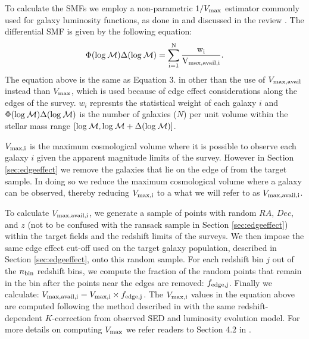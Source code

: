 \documentclass{emulateapj}
\begin{document}
To calculate the SMFs we employ a non-parametric $1/{V_{\rm{max}}}$ estimator commonly used for galaxy luminosity functions, as done in \cite{Moustakas:2013aa} and discussed 
in the review \cite{Johnston:2011aa}. 
The differential SMF is given by the following equation:
\begin{equation} \label{eq:phi}
\Phi(\rm{log}\: \mathcal{M}) \Delta(\rm{log} \:\mathcal{M}) = \sum\limits_{i=1}^{N} \frac{w_i}{V_{\rm{max,avail},i}}. 
\end{equation}
The equation above is the same as Equation 3. in \cite{Moustakas:2013aa} other than the use of $V_{\rm{max,avail}}$ instead than $V_{\rm{max}}$, which is used because of edge effect 
considerations along the edges of the survey. 
$w_i$ represnts the statistical weight of each galaxy $i$ and $\Phi(\rm{log}\: \mathcal{M}) \Delta(\rm{log}\: \mathcal{M})$ is the number of galaxies ($N$) per unit volume within the 
stellar mass range $[\rm{log} \:\mathcal{M}, \rm{log} \:\mathcal{M}+\Delta(\rm{log} \:\mathcal{M})]$.

$V_{\rm{max},i}$ is the maximum cosmological volume where it is possible to observe each galaxy $i$ given the apparent magnitude limits of the survey.
However in Section \ref{sec:edgeeffect} we remove the galaxies that lie on the edge of from the target sample. 
In doing so we reduce the maximum cosmological volume where a galaxy can be observed, thereby reducing $V_{\rm{max},i}$ to a what we will refer to as $V_{\rm{max,avail},i}$.

To calculate $V_{\rm{max,avail},i}$, we generate a sample of points with random $RA$, $Dec$, and $z$ (not to be confused with the ransack sample in Section \ref{sec:edgeeffect}) 
within the target fields and the redshift limits of the surveys.
We then impose the same edge effect cut-off used on the target galaxy population, described in Section \ref{sec:edgeeffect}, onto this random sample. 
For each redshift bin $j$ out of the $n_{\rm{bin}}$ redshift bins, we compute the fraction of the random points that remain in the bin after the points near the edges are removed: 
$f_{\rm{edge},j}$.
Finally we calculate: $V_{\rm{max,avail},i} = V_{\rm{max},i} \times f_{\rm{edge},j}$. 
The $V_{\rm{max},i}$ values in the equation above are computed following the method described in \cite{Moustakas:2013aa} with the same redshift-dependent $K$-correction 
from observed SED and luminosity evolution model.
For more details on computing $V_{\rm{max}}$ we refer readers to Section 4.2 in \cite{Moustakas:2013aa}. 
\end{document}

